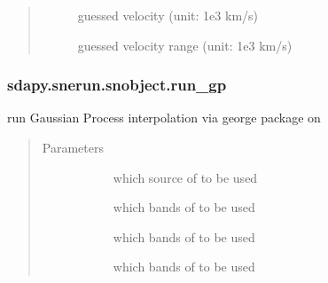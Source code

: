 \documentclass[letterpaper,10pt,english]{sphinxmanual}
\begin{document}
\begin{fulllineitems}
\begin{fulllineitems}
\begin{quote}
\begin{description}
\begin{description}
\item[{}] \leavevmode{[}\sphinxtitleref{float}{]}
guessed velocity (unit: 1e3 km/s)

\item[{}] \leavevmode{[}\sphinxtitleref{list}{]}
guessed velocity range (unit: 1e3 km/s)

\end{description}

\end{description}\end{quote}

\end{fulllineitems}



\subsubsection{sdapy.snerun.snobject.run\_gp}
\label{\detokenize{generated/sdapy.snerun.snobject.run_gp:sdapy-snerun-snobject-run-gp}}\label{\detokenize{generated/sdapy.snerun.snobject.run_gp::doc}}

\begin{fulllineitems}
\label{\detokenize{generated/sdapy.snerun.snobject.run_gp:sdapy.snerun.snobject.run_gp}}
run Gaussian Process interpolation via george package on 
\begin{quote}\begin{description}
\item[{Parameters}] \leavevmode\begin{description}
\item[{}] \leavevmode{[}\sphinxtitleref{str}{]}
which source of  to be used

\item[{}] \leavevmode{[}\sphinxtitleref{list}{]}
which bands of  to be used

\item[{}] \leavevmode{[}\sphinxtitleref{list}{]}
which bands of  to be used

\item[{}] \leavevmode{[}\sphinxtitleref{list}{]}
which bands of  to be used


\end{description}
\end{description}
\end{quote}
\end{fulllineitems}
\end{fulllineitems}
\end{document}
